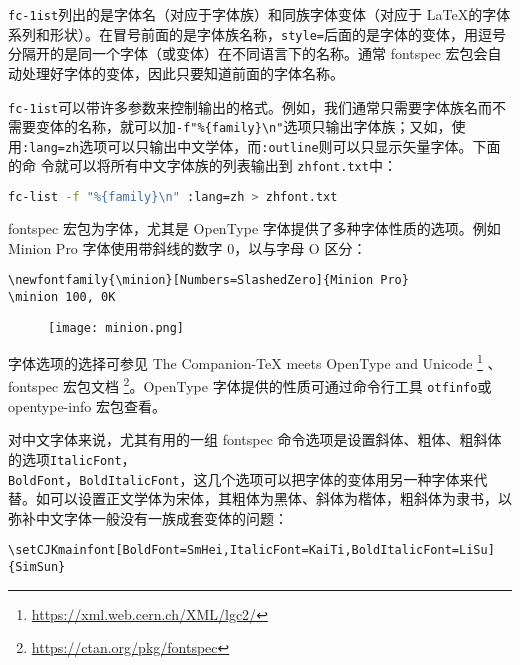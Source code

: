 \verb|fc-1ist|列出的是字体名（对应于字体族）和同族字体变体（对应于 \LaTeX 的字体系列和形状）。在冒号前面的是字体族名称，\verb|style=|后面的是字体的变体，用逗号分隔开的是同一个字体（或变体）在不同语言下的名称。通常 fontspec 宏包会自动处理好字体的变体，因此只要知道前面的字体名称。

\verb|fc-1ist|可以带许多参数来控制输出的格式。例如，我们通常只需要字体族名而不需要变体的名称，就可以加\verb|-f"%{family}\n"|选项只输出字体族；又如，使用\verb|:lang=zh|选项可以只输出中文学体，而\verb|:outline|则可以只显示矢量字体。下面的命
令就可以将所有中文字体族的列表输出到 \verb|zhfont.txt|中：
\begin{lstlisting}[language=sh]
    fc-list -f "%{family}\n" :lang=zh > zhfont.txt
\end{lstlisting}

fontspec 宏包为字体，尤其是 OpenType 字体提供了多种字体性质的选项。例如 Minion Pro 字体使用带斜线的数字 0，以与字母 O 区分：

\begin{minipage}[t]{0.45\textwidth}
\begin{lstlisting}
\newfontfamily{\minion}[Numbers=SlashedZero]{Minion Pro}
\minion 100, 0K
\end{lstlisting}
\end{minipage}
\hfill
\begin{minipage}[t]{0.45\textwidth}
\begin{figure}[H]
    \centering
    \texttt{[image: minion.png]}
\end{figure}
\end{minipage}

字体选项的选择可参见 The \XeTeX Companion-TeX meets OpenType and Unicode \footnote{ \href{https://xml.web.cern.ch/XML/lgc2/}{https://xml.web.cern.ch/XML/lgc2/}} 、fontspec 宏包文档 \footnote{\href{https://ctan.org/pkg/fontspec}{https://ctan.org/pkg/fontspec}}。OpenType
字体提供的性质可通过命令行工具 \verb|otfinfo|或 opentype-info 宏包查看。

对中文字体来说，尤其有用的一组 fontspec 命令选项是设置斜体、粗体、粗斜体的选项\verb|ItalicFont|，\\
\verb|BoldFont|，\verb|BoldItalicFont|，这几个选项可以把字体的变体用另一种字体来代替。如可以设置正文学体为宋体，其粗体为黑体、斜体为楷体，粗斜体为隶书，以弥补中文字体一般没有一族成套变体的问题：

\begin{lstlisting}
\setCJKmainfont[BoldFont=SmHei,ItalicFont=KaiTi,BoldItalicFont=LiSu]{SimSun}
\end{lstlisting}

